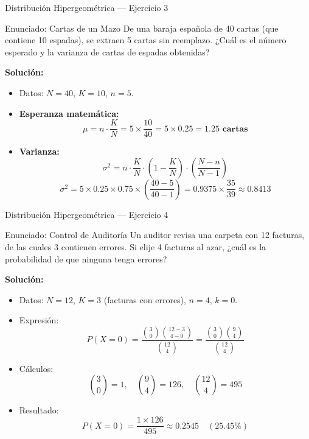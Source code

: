 \documentclass[aspectratio=169, 10pt]{beamer}
\begin{document}
\begin{frame}{Distribución Hipergeométrica — Ejercicio 3}
    \begin{exampleblock}{Enunciado: Cartas de un Mazo}
        De una baraja española de 40 cartas (que contiene 10 espadas), se extraen 5 cartas sin reemplazo. ¿Cuál es el número esperado y la varianza de cartas de espadas obtenidas?
    \end{exampleblock}
        \pause
    \textbf{Solución:}
    \begin{itemize}
        \item Datos: $N = 40$, $K = 10$, $n = 5$.
        \item \textbf{Esperanza matemática:}
        $$\mu = n \cdot \frac{K}{N} = 5 \times \frac{10}{40} = 5 \times 0.25 = \mathbf{1.25 \text{ cartas}}$$
        \item \textbf{Varianza:}
        $$\sigma^2 = n \cdot \frac{K}{N} \cdot \left(1 - \frac{K}{N}\right) \cdot \left(\frac{N-n}{N-1}\right)$$
        $$\sigma^2 = 5 \times 0.25 \times 0.75 \times \left(\frac{40-5}{40-1}\right) = 0.9375 \times \frac{35}{39} \approx \mathbf{0.8413}$$
    \end{itemize}
\end{frame}

\begin{frame}{Distribución Hipergeométrica — Ejercicio 4}
    \begin{exampleblock}{Enunciado: Control de Auditoría}
        Un auditor revisa una carpeta con 12 facturas, de las cuales 3 contienen errores. Si elije 4 facturas al azar, ¿cuál es la probabilidad de que ninguna tenga errores?
    \end{exampleblock}
        \pause
    \textbf{Solución:}
    \begin{itemize}
        \item Datos: $N = 12$, $K = 3$ (facturas con errores), $n = 4$, $k = 0$.
        \item Expresión:
        $$P(X = 0) = \frac{\binom{3}{0} \binom{12-3}{4-0}}{\binom{12}{4}} = \frac{\binom{3}{0} \binom{9}{4}}{\binom{12}{4}}$$
        \item Cálculos:
        $$\binom{3}{0} = 1, \quad \binom{9}{4} = 126, \quad \binom{12}{4} = 495$$
        \item Resultado:
        $$P(X = 0) = \frac{1 \times 126}{495} \approx \mathbf{0.2545} \quad (25.45\%)$$
    \end{itemize}
\end{frame}
\end{document}
